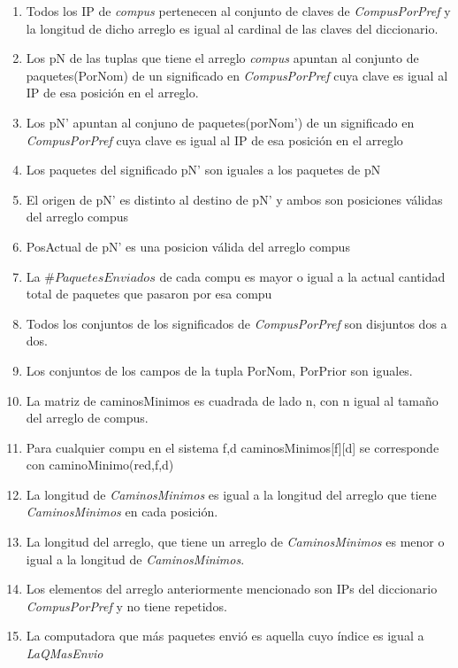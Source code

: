 \begin{enumerate}
  \item Todos los IP de \textit{compus} pertenecen al conjunto de claves de \textit{CompusPorPref} y la longitud de dicho arreglo 
		es igual al cardinal de las claves del diccionario. 
  \item Los pN de las tuplas que tiene el arreglo \textit{compus} apuntan al conjunto de paquetes(PorNom) 
		de un significado en \textit{CompusPorPref} cuya clave es igual al IP de esa posición en el arreglo.
  \item Los pN' apuntan al conjuno de paquetes(porNom') de un significado en \textit{CompusPorPref} cuya clave es igual al IP 
		de esa posición en el arreglo
  \item Los paquetes del significado pN' son iguales a los paquetes de pN
  \item El origen de pN' es distinto al destino de pN' y ambos son posiciones válidas del arreglo compus
  \item PosActual de pN' es una posicion válida del arreglo compus
  \item La $\#PaquetesEnviados$ de cada compu es mayor o igual a la actual cantidad total de paquetes que pasaron por esa compu
  \item Todos los conjuntos de los significados de \textit{CompusPorPref} son disjuntos dos a dos.
  \item Los conjuntos de los campos de la tupla PorNom, PorPrior son iguales.
  \item La matriz de caminosMinimos es cuadrada de lado n, con n igual al tamaño del arreglo de compus.
  \item Para cualquier compu en el sistema f,d caminosMinimos[f][d] se corresponde con caminoMinimo(red,f,d)
  \item La longitud de \textit{CaminosMinimos} es igual a la longitud del arreglo que tiene \textit{CaminosMinimos} en cada posición.
  \item La longitud del arreglo, que tiene un arreglo de \textit{CaminosMinimos} es menor o igual a la longitud de \textit{CaminosMinimos}.
  \item Los elementos del arreglo anteriormente mencionado son IPs del diccionario \textit{CompusPorPref} y no tiene repetidos.
  \item La computadora que más paquetes envió es aquella cuyo índice es igual a \textit{LaQMasEnvio}
\end{enumerate}

